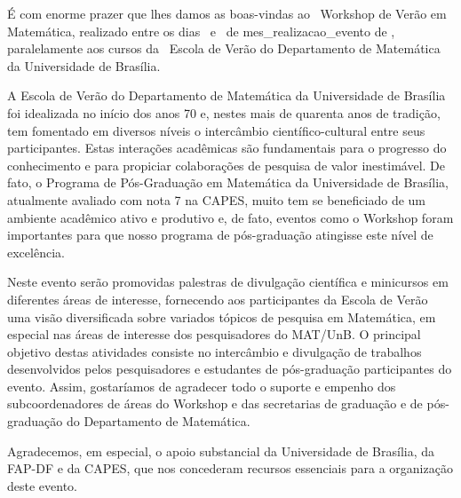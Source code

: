 \'{E} com enorme prazer que lhes damos as boas-vindas ao \edworkshop\ Workshop de Ver\~{a}o em Matem\'{a}tica, realizado entre os dias \datainic\ e \datafim\ de mes_realizacao_evento de \ano, paralelamente aos cursos da \edverao\ Escola de Ver\~{a}o do Departamento de Matem\'{a}tica da Universidade de Bras\'{i}lia.

\vspace{24pt}

A Escola de Ver\~{a}o do Departamento de Matem\'{a}tica da Universidade de Bras\'{i}lia foi idealizada no in\'{i}cio dos anos 70 e, nestes mais de quarenta anos de tradi\c{c}\~{a}o, tem fomentado em diversos n\'{i}veis o interc\^{a}mbio cient\'{i}fico-cultural entre seus participantes. Estas intera\c{c}\~{o}es acad\^{e}micas s\~{a}o fundamentais para o progresso do conhecimento e para propiciar colabora\c{c}\~{o}es de pesquisa de valor inestim\'{a}vel. De fato, o Programa de P\'{o}s-Gradua\c{c}\~{a}o em Matem\'{a}tica da Universidade de Bras\'{i}lia, atualmente avaliado com nota 7 na CAPES, muito tem se beneficiado de um ambiente acad\^{e}mico ativo e produtivo e, de fato, eventos como o Workshop foram importantes para que nosso programa de p\'{o}s-gradua\c{c}\~{a}o atingisse este n\'{i}vel de excel\^{e}ncia.

\vspace{24pt}

Neste evento ser\~{a}o promovidas palestras de divulga\c{c}\~{a}o cient\'{i}fica e minicursos em diferentes \'{a}reas de interesse, fornecendo aos participantes da Escola de Ver\~{a}o uma vis\~{a}o diversificada sobre variados t\'{o}picos de pesquisa em Matem\'{a}tica, em especial nas \'{a}reas de interesse dos pesquisadores do MAT/UnB. O principal objetivo destas atividades consiste no interc\^{a}mbio e divulga\c{c}\~{a}o de trabalhos desenvolvidos pelos pesquisadores e estudantes de p\'{o}s-gradua\c{c}\~{a}o participantes do evento. Assim, gostar\'{i}amos de agradecer todo o suporte e empenho dos subcoordenadores de \'{a}reas do Workshop e das secretarias de gradua\c{c}\~{a}o e de p\'{o}s-gradua\c{c}\~{a}o do Departamento de Matem\'{a}tica. 

\vspace{24pt}

Agradecemos, em especial, o apoio substancial da Universidade de Bras\'{i}lia, da FAP-DF e da CAPES, que nos concederam recursos essenciais para a organiza\c{c}\~{a}o deste evento.

\vspace{24pt}

